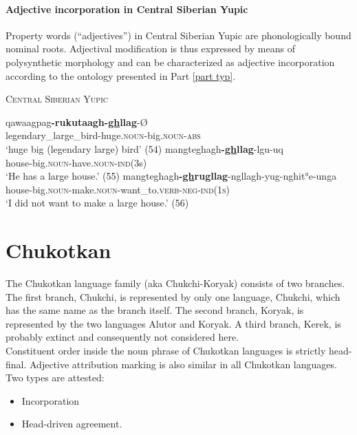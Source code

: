 \paragraph{Adjective incorporation in Central Siberian Yupic}
Property words (“adjectives”) in Central Siberian Yupic are phonologically bound nominal roots. Adjectival modification is thus expressed by means of polysynthetic morphology and can be characterized as adjective incorporation according to the ontology presented in Part \ref{part typ}.
\begin{exe}
\ex \textsc{Central Siberian Yupic} \citep{de-reuse1994}
\begin{xlist}
\ex
\gll	qawaagpag\textbf{-rukutaagh-\underline{gh}llag}-Ø\\
	legendary\_large\_bird-huge.\textsc{noun}-big.\textsc{noun}-\textsc{abs}\\
\glt	‘huge big (legendary large) bird’ (54)
\ex	
\gll	mangteghagh\textbf{-\underline{gh}llag}-lgu-uq\\
	house-big.\textsc{noun}-have.\textsc{noun}-\textsc{ind}(3s)\\
\glt	‘He has a large house.’ (55)
\ex	
\gll	mangteghagh\textbf{-\underline{gh}rugllag}-ngllagh-yug-nghit°e-unga\\
	house-big.\textsc{noun}-make.\textsc{noun}-want\_to.\textsc{verb}-\textsc{neg}-\textsc{ind(1s)}\\
\glt	‘I did not want to make a large house.’ (56)
\end{xlist}
\end{exe}

\section{Chukotkan}
The Chukotkan language family (aka Chukchi-Koryak) consists of two bran\-ches. The first branch, Chukchi, is represented by only one language, Chukchi, which has the same name as the branch itself. The second branch, Koryak, is represented by the two languages Alutor and Koryak. A third branch, Kerek, is probably extinct \cite[253]{salminen2007} and consequently not considered here.\\

\noindent Constituent order inside the noun phrase of Chukotkan languages is strictly head-final. Adjective attribution marking is also similar in all Chukotkan languages. Two types are attested:
\begin{itemize}
\item Incorporation
\item Head-driven agreement.
\end{itemize}

